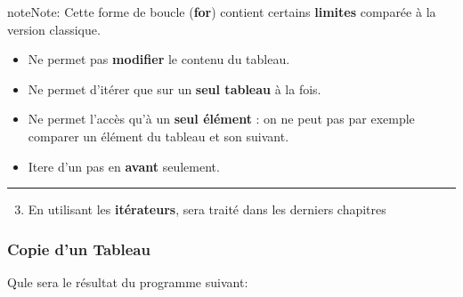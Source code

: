 \documentclass[letterpaper,10pt,english]{sphinxmanual}
\begin{document}
\begin{notice}{note}{Note:}
Cette forme de boucle (\textbf{for}) contient certains \textbf{limites} comparée à la version classique.
\end{notice}
\begin{itemize}
\item {} 
Ne permet pas \textbf{modifier} le contenu du tableau.

\item {} 
Ne permet d’itérer que sur un \textbf{seul tableau} à la fois.

\item {} 
Ne permet l’accès qu’à un \textbf{seul élément} : on ne peut pas par exemple comparer un élément du tableau et son suivant.

\item {} 
Itere d'un pas en \textbf{avant} seulement.

\end{itemize}


\bigskip\hrule{}\bigskip

\begin{enumerate}
\setcounter{enumi}{2}
\item {} 
En utilisant les \textbf{itérateurs}, sera traité dans les derniers chapitres

\end{enumerate}


\subsubsection{Copie d'un Tableau}
\label{tableaux1:copie-d-un-tableau}
Qule sera le résultat du programme suivant:
\end{document}
